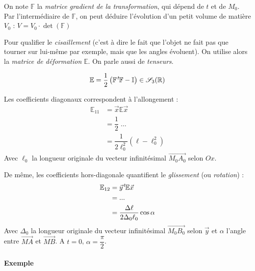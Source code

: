 \documentclass{article}
\newcommand{\transpose}{\hspace{.1em}{}^t\hspace{-.1em}}
\begin{document}
On note $\mathbb{F}$ la \emph{matrice gradient de la transformation}, qui dépend de $t$ et de $M_0$. 
Par l'intermédiaire de $\mathbb{F}$, on peut déduire l'évolution d'un petit volume de matière $V_0$ :  $V = V_0 \cdot \det (\mathbb{F})$

Pour qualifier le \emph{cisaillement} (c'est à dire le fait que l'objet ne fait pas que tourner sur lui-même par exemple, mais que les angles évoluent). On utilise alors la \emph{matrice de déformation} $\mathbb{E}$. On parle aussi de \emph{tenseurs}.

\[\mathbb{E} = \dfrac{1}{2} \left ( \mathbb{F} \transpose\mathbb{F} - \mathbb{I} \right ) \in \mathscr{S}_3(\mathbb{R})\]

Les coefficients diagonaux correspondent à l'allongement :
\begin{align*}
\mathbb{E}_{11} & = \vec{x}\mathbb{E}\vec{x}\\
& = \dfrac{1}{2} \; \hdots\\
& = \dfrac{1}{2\ell_0 ^2} \left ( \ell - \ell_0^2 \right )
\end{align*}
Avec $\ell_0$ la longueur originale du vecteur infinitésimal $\overrightarrow{M_0A_0}$ selon $Ox$.
\bigskip

De même, les coefficients hors-diagonale quantifient le \emph{glissement} (ou \emph{rotation}) :
\begin{align*}
\mathbb{E}_{12} & = \vec{y}\transpose \mathbb{E} \vec{x}\\
& = ... \\
& = \dfrac{\Delta \ell}{2 \Delta_0 \ell_0} \cos \alpha
\end{align*}
Avec $\Delta_0$ la longueur originale du vecteur infinitésimal $\overrightarrow{M_0B_0}$ selon $\vec{y}$ et $\alpha$ l'angle entre $\overrightarrow{MA}$ et $\overrightarrow{MB}$. A $t=0$, $\alpha = \dfrac{\pi}{2}$.

\paragraph{Exemple} 
\end{document}

